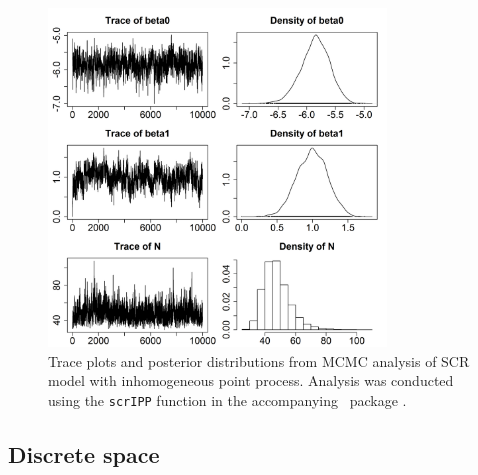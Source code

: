 \begin{figure}[h!]
  \centering
  \includegraphics[width=0.8\textwidth]{Ch11-Statespace/figs/fm1p}
  \caption{Trace plots and posterior distributions from MCMC analysis
    of SCR model with inhomogeneous point process. Analysis was
    conducted using the \texttt{scrIPP} function in the accompanying
    \R~package \scrbook.}
  \label{state-space.fig.fm1post}
\end{figure}



\subsection{Discrete space}
\label{modeling.sec.discrete}

